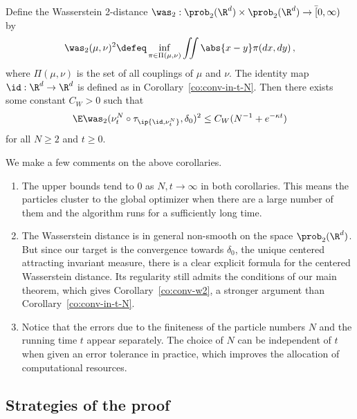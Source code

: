 \documentclass{amsart}
\begin{document}
\begin{corollary}
\label{co:conv-w2}
    Define the Wasserstein 2-distance $\was_2: \prob_2(\R^d) \times \prob_2(\R^d) \to \bar [0, \infty)$ by 
    \begin{equation*}
        \was_2(\mu, \nu)^2 \defeq \inf_{\pi \in \Pi(\mu,\nu)} \iint \abs{x-y} \pi(dx,dy) \,,
    \end{equation*}
    where $\Pi(\mu,\nu)$ is the set of all couplings of $\mu$ and $\nu$. 
    The identity map $\id: \R^d \to \R^d$ is defined as in Corollary~\ref{co:conv-in-t-N}.
    Then there exists some constant $C_{W} > 0$ such that 
    \begin{equation*}
        \E \was_2(\nu^N_t \circ \tau_{\ip{\id, \nu^N_t}}, \delta_0)^2 \le C_W(N^{-1} + e^{-\kappa t}) 
    \end{equation*}
    for all $N \ge 2$ and $t \ge 0$.
\end{corollary}

\begin{remark}
    We make a few comments on the above corollaries.
    \begin{enumerate}
        \item The upper bounds tend to 0 as $N, t \to \infty$ in both corollaries. 
        This means the particles cluster to the global optimizer when there are a large number of them and the algorithm runs for a sufficiently long time.

        \item The Wasserstein distance is in general non-smooth on the space $\prob_2(\R^d)$. 
        But since our target is the convergence towards $\delta_0$, the unique centered attracting invariant measure, there is a clear explicit formula for the centered Wasserstein distance.
        Its regularity still admits the conditions of our main theorem, which gives Corollary~\ref{co:conv-w2}, a stronger argument than Corollary~\ref{co:conv-in-t-N}.
        
        \item Notice that the errors due to the finiteness of the particle numbers $N$ and the running time $t$ appear separately. 
        The choice of $N$ can be independent of $t$ when given an error tolerance in practice, which improves the allocation of computational resources.
    \end{enumerate}
\end{remark}



\subsection{Strategies of the proof}
\label{s:strategy}
\end{document}
